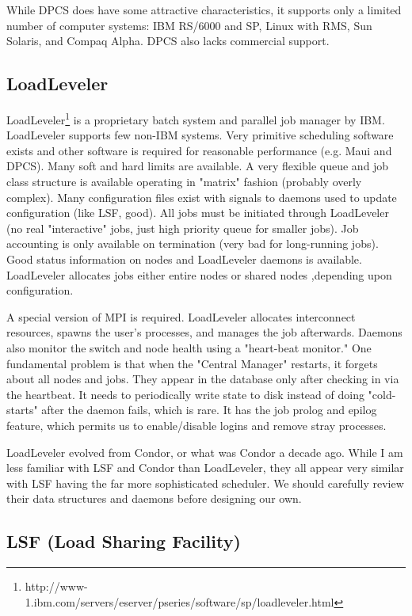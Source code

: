 While DPCS does have some attractive characteristics, it supports only a 
limited number of computer systems: IBM RS/6000 and SP, Linux with RMS, 
Sun Solaris, and Compaq Alpha. DPCS also lacks commercial support.

\subsection{LoadLeveler}

LoadLeveler\footnote{
http://www-1.ibm.com/servers/eserver/pseries/software/sp/loadleveler.html}
is a proprietary batch system and parallel job manager by 
IBM. LoadLeveler supports few non-IBM systems. Very primitive 
scheduling software exists and other software is required for reasonable 
performance (e.g. Maui and DPCS). Many soft and hard limits are available. 
A very flexible queue and job class structure is available operating in "matrix" fashion 
(probably overly complex). Many configuration files exist with signals to 
daemons used to update configuration (like LSF, good). All jobs must 
be initiated through LoadLeveler (no real "interactive" jobs, just 
high priority queue for smaller jobs). Job accounting is only available 
on termination (very bad for long-running jobs). Good status 
information on nodes and LoadLeveler daemons is available. LoadLeveler 
allocates jobs either entire nodes or shared nodes ,depending upon configuration.

A special version of MPI is required. LoadLeveler allocates 
interconnect resources, spawns the user's processes, and manages the 
job afterwards. Daemons also monitor the switch and node health using 
a "heart-beat monitor." One fundamental problem is that when the 
"Central Manager" restarts, it forgets about all nodes and jobs. They 
appear in the database only after checking in via the heartbeat. It 
needs to periodically write state to disk instead of doing 
"cold-starts" after the daemon fails, which is rare. It has the job 
prolog and epilog feature, which permits us to enable/disable logins 
and remove stray processes.

LoadLeveler evolved from Condor, or what was Condor a decade ago. 
While I am less familiar with LSF and Condor than LoadLeveler, they 
all appear very similar with LSF having the far more sophisticated 
scheduler. We should carefully review their data structures and 
daemons before designing our own.

\subsection{LSF (Load Sharing Facility)}

